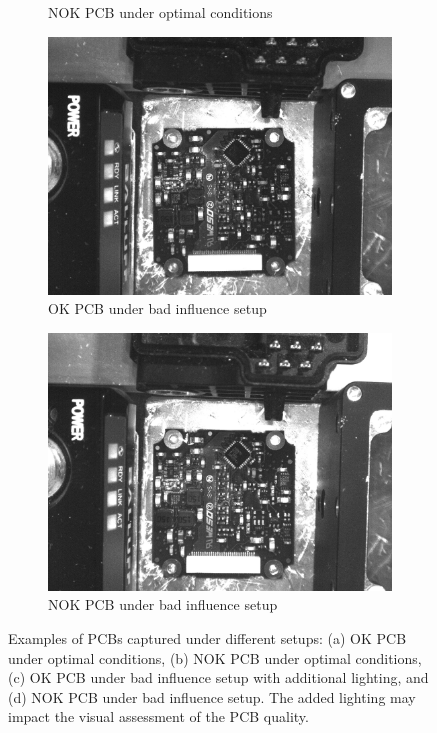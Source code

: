 \documentclass[12pt,DIV14,BCOR12mm,a4paper,footinclude=false,headinclude,parskip=half-,twoside,openright,cleardoublepage=empty,toc=index,bibliography=totoc,listof=totoc]{scrreprt}
\numberwithin{equation}{chapter}
\begin{document}
\begin{figure}
\begin{subfigure}[b]{0.45\textwidth}
        \caption{NOK PCB under optimal conditions}
        \label{fig:pcb_optimal_nok}
    \end{subfigure}
    \hfill
    \begin{subfigure}[b]{0.45\textwidth}
        \centering
        \includegraphics[scale=0.15]{../media/PCB-influence-OK.png}
        \caption{OK PCB under bad influence setup}
        \label{fig:pcb_bad_influence_ok}
    \end{subfigure}
    \hfill
    \begin{subfigure}[b]{0.45\textwidth}
        \centering
        \includegraphics[scale=0.15]{../media/PCB-influence-NOK.png}
        \caption{NOK PCB under bad influence setup}
        \label{fig:pcb_bad_influence_nok}
    \end{subfigure}
    \caption{Examples of PCBs captured under different setups: (a) OK PCB under optimal conditions, (b) NOK PCB under optimal conditions, (c) OK PCB under bad influence setup with additional lighting, and (d) NOK PCB under bad influence setup. The added lighting may impact the visual assessment of the PCB quality.}
    \label{fig:pcb_combined}
\end{figure}
\end{document}
